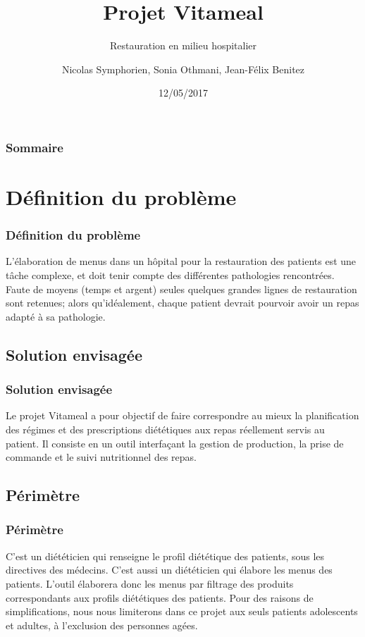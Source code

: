 \documentclass{beamer}
\title{Projet Vitameal}
\subtitle{Restauration en milieu hospitalier}
\author{Nicolas Symphorien, Sonia Othmani, Jean-Félix Benitez}
\institute{CNAM}
\date{12/05/2017}
\begin{document}
\begin{frame}[plain]
  \titlepage
\end{frame}

\begin{frame}
  \frametitle{Sommaire}
  \tableofcontents
\end{frame}

\section{Définition du problème}
\begin{frame}[label=definitionDuProbleme]
\frametitle{Définition du problème}
L'élaboration de menus dans un hôpital pour la restauration des patients
est une tâche complexe, et doit tenir compte des différentes pathologies
rencontrées. Faute de moyens (temps et argent) seules quelques grandes
lignes de restauration sont retenues; alors qu'idéalement, chaque
patient devrait pourvoir avoir un repas adapté à sa pathologie.
\end{frame}

\subsection{Solution envisagée}
\begin{frame}[label=solutionEnvisagée]
\frametitle{Solution envisagée}
Le projet Vitameal a pour objectif de faire correspondre au mieux la planification des régimes et des
prescriptions diététiques aux repas réellement servis au patient. Il consiste en un outil interfaçant la
gestion de production, la prise de commande et le suivi nutritionnel des repas.
\end{frame}

\subsection{Périmètre}
\begin{frame}[label=perimetre]
\frametitle{Périmètre}
C'est un diététicien qui renseigne le profil diététique des patients,
sous les directives des médecins. C'est aussi un diététicien qui élabore
les menus des patients. L'outil élaborera donc
les menus par filtrage des produits correspondants aux profils
diététiques des patients. Pour des raisons de simplifications, nous nous limiterons dans ce projet aux seuls patients adolescents et adultes, à l'exclusion des personnes agées.
\end{frame}
\end{document}
